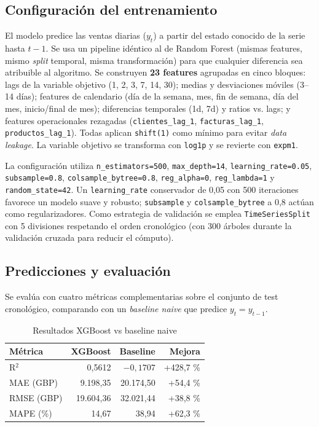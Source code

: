 \documentclass[11pt,a4paper]{article}
\begin{document}
\subsection{Configuración del entrenamiento}

El modelo predice las ventas diarias ($y_t$) a partir del estado conocido de la serie hasta $t-1$. Se usa un pipeline idéntico al de Random Forest (mismas features, mismo \textit{split} temporal, misma transformación) para que cualquier diferencia sea atribuible al algoritmo. Se construyen \textbf{23 features} agrupadas en cinco bloques: lags de la variable objetivo (1, 2, 3, 7, 14, 30); medias y desviaciones móviles (3--14 días); features de calendario (día de la semana, mes, fin de semana, día del mes, inicio/final de mes); diferencias temporales (1d, 7d) y ratios vs. lags; y features operacionales rezagadas (\texttt{clientes\_lag\_1}, \texttt{facturas\_lag\_1}, \texttt{productos\_lag\_1}). Todas aplican \texttt{shift(1)} como mínimo para evitar \textit{data leakage}. La variable objetivo se transforma con \texttt{log1p} y se revierte con \texttt{expm1}.

La configuración utiliza \texttt{n\_estimators=500}, \texttt{max\_depth=14}, \texttt{learning\_rate=0.05}, \texttt{subsample=0.8}, \texttt{colsample\_bytree=0.8}, \texttt{reg\_alpha=0}, \texttt{reg\_lambda=1} y \texttt{random\_state=42}. Un \texttt{learning\_rate} conservador de 0,05 con 500 iteraciones favorece un modelo suave y robusto; \texttt{subsample} y \texttt{colsample\_bytree} a 0,8 actúan como regularizadores. Como estrategia de validación se emplea \texttt{TimeSeriesSplit} con 5 divisiones respetando el orden cronológico (con 300 árboles durante la validación cruzada para reducir el cómputo).

\subsection{Predicciones y evaluación}

Se evalúa con cuatro métricas complementarias sobre el conjunto de test cronológico, comparando con un \textit{baseline naive} que predice $y_t = y_{t-1}$.

\begin{table}[H]
\centering
\caption{Resultados XGBoost vs baseline naive}
\begin{tabular}{lrrr}
\toprule
\textbf{Métrica} & \textbf{XGBoost} & \textbf{Baseline} & \textbf{Mejora} \\
\midrule
R$^2$ & 0,5612 & $-0,1707$ & +428,7 \% \\
MAE (GBP) & 9.198,35 & 20.174,50 & +54,4 \% \\
RMSE (GBP) & 19.604,36 & 32.021,44 & +38,8 \% \\
MAPE (\%) & 14,67 & 38,94 & +62,3 \% \\
\bottomrule
\end{tabular}
\end{table}
\end{document}
